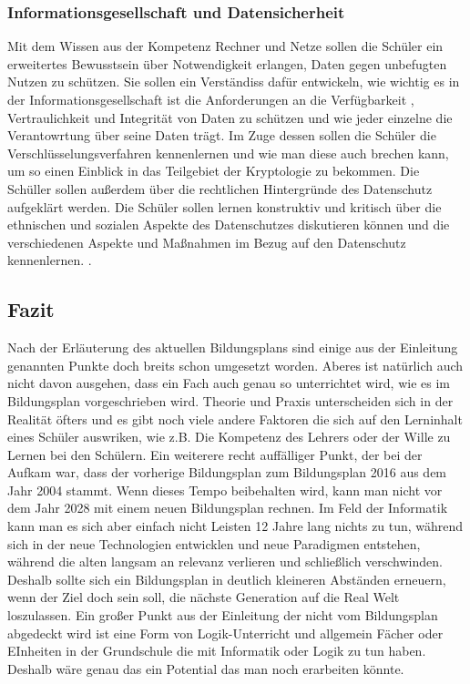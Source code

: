 \subsubsection{Informationsgesellschaft und Datensicherheit}

Mit dem Wissen aus der Kompetenz Rechner und Netze sollen die Schüler ein erweitertes Bewusstsein über Notwendigkeit erlangen, Daten gegen unbefugten Nutzen zu schützen. Sie sollen ein Verständiss dafür entwickeln, wie wichtig es in der Informationsgesellschaft ist die Anforderungen an die Verfügbarkeit , Vertraulichkeit und Integrität von Daten zu schützen und wie jeder einzelne die Verantowrtung über seine Daten trägt. Im Zuge dessen sollen die Schüler die Verschlüsselungsverfahren kennenlernen und wie man diese auch brechen kann, um so einen Einblick in das Teilgebiet der Kryptologie zu bekommen. Die Schüller sollen außerdem über die rechtlichen Hintergründe des Datenschutz aufgeklärt werden. Die Schüler sollen lernen konstruktiv und kritisch über die ethnischen und sozialen Aspekte des Datenschutzes diskutieren können und die verschiedenen Aspekte und Maßnahmen im Bezug auf den Datenschutz kennenlernen.
\cite{InfoGes}.

\subsection{Fazit}
Nach der Erläuterung des aktuellen Bildungsplans sind einige aus der Einleitung genannten Punkte doch breits schon umgesetzt worden. Aberes ist natürlich auch nicht davon ausgehen, dass ein Fach auch genau so unterrichtet wird, wie es im Bildungsplan vorgeschrieben wird. Theorie und Praxis unterscheiden sich in der Realität öfters und es gibt noch viele andere Faktoren die sich auf den Lerninhalt eines Schüler auswriken, wie z.B. Die Kompetenz des Lehrers oder der Wille zu Lernen bei den Schülern. Ein weiterere recht auffälliger Punkt, der bei der Aufkam war, dass der vorherige Bildungsplan zum Bildungsplan 2016 aus dem Jahr 2004 stammt. Wenn dieses Tempo beibehalten wird, kann man nicht vor dem Jahr 2028 mit einem neuen Bildungsplan rechnen. Im Feld der Informatik kann man es sich aber einfach nicht Leisten 12 Jahre lang nichts zu tun, während sich in der neue Technologien entwicklen und neue Paradigmen entstehen, während die alten langsam an relevanz verlieren und schließlich verschwinden. Deshalb sollte sich ein Bildungsplan in deutlich kleineren Abständen erneuern, wenn der Ziel doch sein soll, die nächste Generation auf die Real Welt loszulassen. Ein großer Punkt aus der Einleitung der nicht vom Bildungsplan abgedeckt wird ist eine Form von Logik-Unterricht und allgemein Fächer oder EInheiten in der Grundschule die mit Informatik oder Logik zu tun haben. Deshalb wäre genau das ein Potential das man noch erarbeiten könnte.


